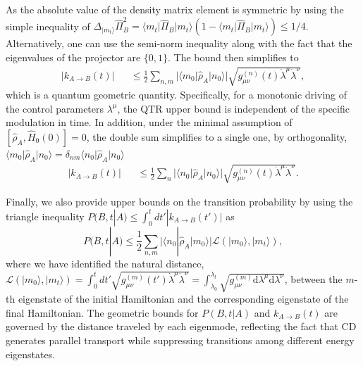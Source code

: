 \documentclass[prl,aps,amssymb,twocolumn,superscriptaddress, notitlepage, longbibliography]{revtex4-2}
\begin{document}
As the absolute value of the density matrix element is symmetric by using the simple inequality of $\Delta_{\vert m_t\rangle}\hat\Pi^2_B=\langle m_t\lvert\hat\Pi_B\rvert m_t\rangle\left(1-\langle m_t\lvert\hat\Pi_B\rvert m_t\rangle\right)\leq1/4$. Alternatively, one can use the semi-norm inequality \cite{Boixo07} along with the fact that the eigenvalues of the projector are $\{0,1\}$.
The bound then simplifies to
\begin{eqnarray}
    \lvert k_{A\rightarrow B}(t)\rvert&&\leq\frac{1}{2}\sum_{n,m}\lvert\langle m_0\lvert\hat\rho_A\rvert n_0\rangle\rvert\sqrt{g^{(n)}_{\mu\nu}(t)\dot\lambda^\mu\dot\lambda^\nu},
\end{eqnarray}
which is a quantum geometric quantity. Specifically, for a monotonic driving of the control parameters $\lambda^\mu$,  the QTR upper bound is independent of the specific modulation in time.
In addition, under the minimal assumption of $\left[\hat\rho_A,\hat H_0(0)\right]=0$, the double sum simplifies to a single one, by orthogonality, $\langle m_0\lvert\hat\rho_A\rvert n_0\rangle=\delta_{nm}\langle n_0\lvert\hat\rho_A\rvert n_0\rangle$
\begin{eqnarray}
    \lvert k_{A\rightarrow B}(t)\rvert&&\leq\frac{1}{2}\sum_{n}\lvert\langle n_0\lvert\hat\rho_A\rvert n_0\rangle\rvert\sqrt{g^{(n)}_{\mu\nu}(t)\dot\lambda^\mu\dot\lambda^\nu}.
\end{eqnarray}

Finally, we also provide upper bounds on the transition probability by using the triangle inequality $P(B,t|A)\leq \int_0^t dt'|k_{A\rightarrow B}(t')|$ as
\begin{equation}
P(B,t|A)\leq \frac{1}{2}\sum_{n,m}\lvert\langle n_0|\hat{\rho}_A|m_0\rangle\rvert \mathcal{L}(|m_0\rangle,|m_t\rangle),
\end{equation}
where we have identified the natural distance,
$\mathcal{L}(|m_0\rangle,|m_t\rangle)=\int_0^tdt'\sqrt{g_{\mu\nu}^{(m)}(t')\dot{\lambda}^\mu\dot{\lambda}^\nu}=\int_{\lambda_0}^{\lambda_t}\sqrt{g_{\mu\nu}^{(m)}\mathrm d\lambda^{\mu}\mathrm d\lambda^\nu}$,
between the $m$-th eigenstate of the initial Hamiltonian and the corresponding eigenstate of the final Hamiltonian.
The geometric bounds for $P(B,t|A)$ and $k_{A\rightarrow B}(t)$ are governed by the distance traveled by each eigenmode, reflecting the fact that CD generates parallel transport while suppressing transitions among different energy eigenstates.
\end{document}
